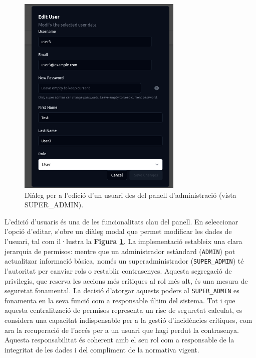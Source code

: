 \begin{figure}[H]
    \centering
    \includegraphics[width=0.7\textwidth]{Figures/ui-web/user_settings_admin.png}
    \caption{Diàleg per a l'edició d'un usuari des del panell d'administració (vista SUPER\_ADMIN).}
    \label{fig:react-edit-user-admin-impl}
\end{figure}

L'edició d'usuaris és una de les funcionalitats clau del panell. En seleccionar l'opció d'editar, s'obre un diàleg modal que permet modificar les dades de l'usuari, tal com il·lustra la \textbf{Figura \ref{fig:react-edit-user-admin-impl}}. La implementació estableix una clara jerarquia de permisos: mentre que un administrador estàndard (\texttt{ADMIN}) pot actualitzar informació bàsica, només un superadministrador (\texttt{SUPER\_ADMIN}) té l'autoritat per canviar rols o restablir contrasenyes. Aquesta segregació de privilegis, que reserva les accions més crítiques al rol més alt, és una mesura de seguretat fonamental. La decisió d'atorgar aquests poders al \texttt{SUPER\_ADMIN} es fonamenta en la seva funció com a responsable últim del sistema. Tot i que aquesta centralització de permisos representa un risc de seguretat calculat, es considera una capacitat indispensable per a la gestió d'incidències crítiques, com ara la recuperació de l'accés per a un usuari que hagi perdut la contrasenya. Aquesta responsabilitat és coherent amb el seu rol com a responsable de la integritat de les dades i del compliment de la normativa vigent.

